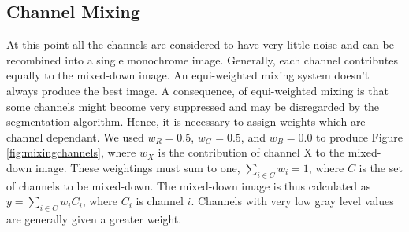 \documentclass[a4paper,11pt]{ijamas}
\begin{document}
\subsection{Channel Mixing}
\label{sec:proposed_channelmixing}
At this point all the channels are considered to have very little noise and can be recombined into a single monochrome image. Generally, each channel contributes equally to the mixed-down image.
An equi-weighted mixing system doesn't always produce the best image. A consequence, of equi-weighted mixing is that some channels might become very suppressed and may be disregarded by the segmentation algorithm. Hence, it is necessary to assign weights which are channel dependant. We used $w_R=0.5$, $w_G=0.5$, and $w_B=0.0$ to produce Figure \ref{fig:mixingchannels}, where $w_X$ is the contribution of channel X to the mixed-down image. These weightings must sum to one, $\sum_{i \in C} w_i = 1$, where $C$ is the set of channels to be mixed-down. The mixed-down image is thus calculated as $y = \sum_{i \in C}w_iC_i$, where $C_i$ is channel $i$. Channels with very low gray level values are generally given a greater weight.
\end{document}

